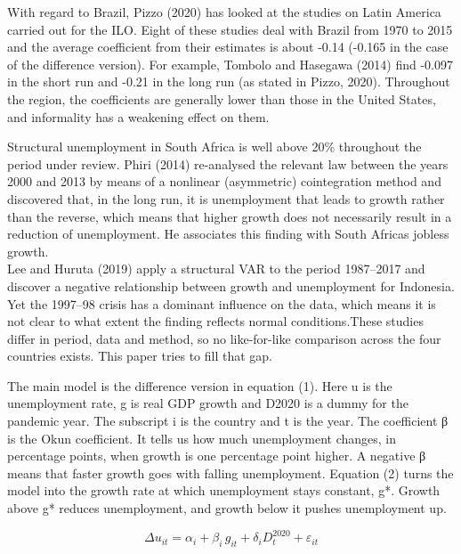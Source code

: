 \documentclass[12pt]{article}
\newcommand{\hone}[2]{\par\Needspace{4\baselineskip}\vspace{2pt}{\noindent\raggedright\bfseries
  \ifx\relax#1\relax\else\makebox[0.5in][l]{#1}\fi #2\par}\nopagebreak\vspace{-2pt}}
\newcommand{\htwo}[2]{\par\Needspace{4\baselineskip}\vspace{2pt}{\noindent\raggedright\bfseries\itshape
  \makebox[0.5in][l]{#1}#2\par}\nopagebreak\vspace{-2pt}}
\begin{document}
With regard to Brazil, Pizzo (2020) has looked at the studies on Latin America carried out for the ILO. Eight of these studies deal with Brazil from 1970 to 2015 and the average coefficient from their estimates is about -0.14 (-0.165 in the case of the difference version). For example, Tombolo and Hasegawa (2014) find -0.097 in the short run and -0.21 in the long run (as stated in Pizzo, 2020). Throughout the region, the coefficients are generally lower than those in the United States, and informality has a weakening effect on them.


Structural unemployment in South Africa is well above 20\% throughout the period under review. Phiri (2014) re-analysed the relevant law between the years 2000 and 2013 by means of a nonlinear (asymmetric) cointegration method and discovered that, in the long run, it is unemployment that leads to growth rather than the reverse, which means that higher growth does not necessarily result in a reduction of unemployment. He associates this finding with South Africa\textquotesingle{}s jobless growth.\\
Lee and Huruta (2019) apply a structural VAR to the period 1987–2017 and discover a negative relationship between growth and unemployment for Indonesia. Yet the 1997–98 crisis has a dominant influence on the data, which means it is not clear to what extent the finding reflects normal conditions.These studies differ in period, data and method, so no like-for-like comparison across the four countries exists. This paper tries to fill that gap.


\hone{3}{Methodology}

\htwo{3.1}{Difference version}

The main model is the difference version in equation (1). Here u is the unemployment rate, g is real GDP growth and D2020 is a dummy for the pandemic year. The subscript i is the country and t is the year. The coefficient β is the Okun coefficient. It tells us how much unemployment changes, in percentage points, when growth is one percentage point higher. A negative β means that faster growth goes with falling unemployment. Equation (2) turns the model into the growth rate at which unemployment stays constant, g*. Growth above g* reduces unemployment, and growth below it pushes unemployment up.


\begin{equation}
\Delta u_{it} = \alpha_i + \beta_i\, g_{it} + \delta_i D_t^{2020} + \varepsilon_{it}
\end{equation}
\end{document}
